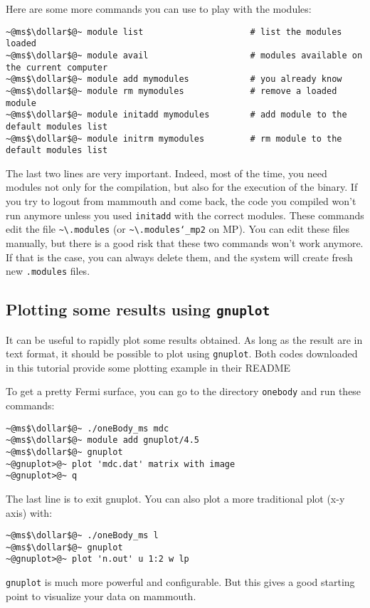 \documentclass[10pt,letter]{article}
\newcommand{\dollar}{\mbox{\textdollar}}
\begin{document}
Here are some more commands you can use to play with the modules:
\begin{bashInput}
\begin{lstlisting}[style=BashInputStyle]
~@ms$\dollar$@~ module list                     # list the modules loaded
~@ms$\dollar$@~ module avail                    # modules available on the current computer
~@ms$\dollar$@~ module add mymodules            # you already know
~@ms$\dollar$@~ module rm mymodules             # remove a loaded module
~@ms$\dollar$@~ module initadd mymodules        # add module to the default modules list
~@ms$\dollar$@~ module initrm mymodules         # rm module to the default modules list
\end{lstlisting}
\end{bashInput}

The last two lines are very important. 
Indeed, most of the time, you need modules not only for the compilation, 
but also for the execution of the binary.
If you try to logout from mammouth and come back, the code you compiled won't run anymore
unless you used \texttt{initadd} with the correct modules. 
These commands edit the file \texttt{\textasciitilde\textbackslash.modules}  (or \texttt{\textasciitilde\textbackslash.modules\char`_mp2} on MP).
You can edit these files manually, but there is a good risk that these two commands won't work anymore.
If that is the case, you can always delete them, and the system will create fresh new \texttt{.modules}  files.

\subsection{Plotting some results using \texttt{gnuplot}}

It can be useful to rapidly plot some results obtained.
As long as the result are in text format, it should be possible to plot using \texttt{gnuplot}.
Both codes downloaded in this tutorial provide some plotting example in their README

To get a pretty Fermi surface, you can go to the directory \texttt{onebody}  and run these commands:
\begin{bashInput}
\begin{lstlisting}[style=BashInputStyle]
~@ms$\dollar$@~ ./oneBody_ms mdc
~@ms$\dollar$@~ module add gnuplot/4.5
~@ms$\dollar$@~ gnuplot
~@gnuplot>@~ plot 'mdc.dat' matrix with image
~@gnuplot>@~ q
\end{lstlisting}
\end{bashInput}
The last line is to exit gnuplot. You can also plot a more traditional plot (x-y axis) with:

\begin{bashInput}
\begin{lstlisting}[style=BashInputStyle]
~@ms$\dollar$@~ ./oneBody_ms l
~@ms$\dollar$@~ gnuplot
~@gnuplot>@~ plot 'n.out' u 1:2 w lp
\end{lstlisting}
\end{bashInput}

\texttt{gnuplot} is much more powerful and configurable. But this gives a good starting point to visualize your 
data on mammouth.
\end{document}
